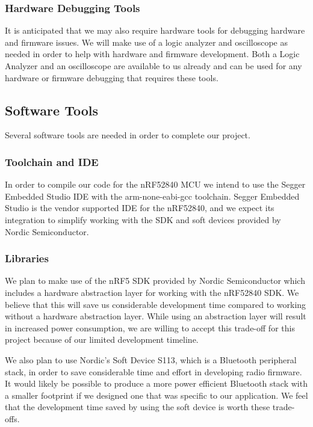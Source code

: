 \subsubsection{Hardware Debugging Tools}

It is anticipated that we may also require hardware tools for debugging hardware
and firmware issues. We will make use of a logic analyzer and oscilloscope as
needed in order to help with hardware and firmware development. Both a Logic
Analyzer and an oscilloscope are available to us already and can be used for any
hardware or firmware debugging that requires these tools.

\subsection{Software Tools}

Several software tools are needed in order to complete our project.

\subsubsection{Toolchain and IDE}

In order to compile our code for the nRF52840 MCU we intend to use the Segger
Embedded Studio IDE with the arm-none-eabi-gcc toolchain. Segger Embedded Studio
is the vendor supported IDE for the nRF52840, and we expect its integration to
simplify working with the SDK and soft devices provided by Nordic Semiconductor.

\subsubsection{Libraries}
\label{subsec:proposed_software_libraries}

We plan to make use of the nRF5 SDK provided by Nordic Semiconductor which
includes a hardware abstraction layer for working with the nRF52840 SDK.  We
believe that this will save us considerable development time compared to working
without a hardware abstraction layer. While using an abstraction layer will
result in increased power consumption, we are willing to accept this trade-off
for this project because of our limited development timeline.

We also plan to use Nordic's Soft Device S113, which is a Bluetooth peripheral
stack, in order to save considerable time and effort in developing radio
firmware. It would likely be possible to produce a more power efficient
Bluetooth stack with a smaller footprint if we designed one that was specific to
our application. We feel that the development time saved by using the soft
device is worth these trade-offs.

